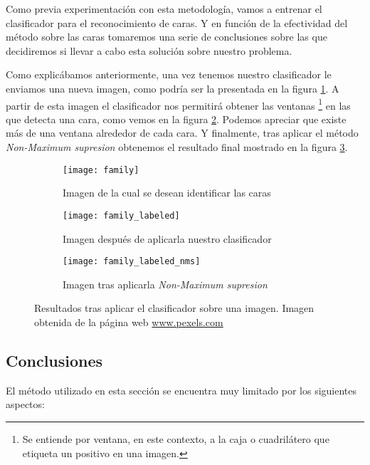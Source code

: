 Como previa experimentación con esta metodología, vamos a entrenar el clasificador para el reconocimiento de caras. Y en función de la efectividad del método sobre las caras tomaremos una serie de conclusiones sobre las que decidiremos si llevar a cabo esta solución sobre  nuestro problema.

Como explicábamos anteriormente, una vez tenemos nuestro clasificador le enviamos una nueva imagen, como podría ser la presentada en la figura \ref{subfig:family}. A partir de esta imagen el clasificador nos permitirá obtener las ventanas \footnote{Se entiende por ventana, en este contexto, a la caja o cuadrilátero que etiqueta un positivo en una imagen.} en las que detecta una cara, como vemos en la figura \ref{subfig:family_labeled}. Podemos apreciar que existe más de una ventana alrededor de cada cara. Y finalmente, tras aplicar el método \textit{Non-Maximum supresion} obtenemos el resultado final mostrado en la figura \ref{subfig:family_labeled_nms}.

\begin{figure}
	\centering
	\begin{subfigure}[b]{0.45\textwidth}
        \texttt{[image: family]}
        \caption{Imagen de la cual se desean identificar las caras}
        \label{subfig:family}
    \end{subfigure}
    \begin{subfigure}[b]{0.45\textwidth}
        \texttt{[image: family\_labeled]}
        \caption{Imagen después de aplicarla nuestro clasificador}
        \label{subfig:family_labeled}
    \end{subfigure}
    \begin{subfigure}[b]{0.45\textwidth}
        \texttt{[image: family\_labeled\_nms]}
        \caption{Imagen tras aplicarla \textit{Non-Maximum supresion}}
         \label{subfig:family_labeled_nms}
    \end{subfigure}
        \caption[Resultados tras aplicar el clasificador sobre una imagen]{Resultados tras aplicar el clasificador sobre una imagen. Imagen obtenida de la página web \url{www.pexels.com}}
	\label{fig:5.1.4}
\end{figure}

\subsection{Conclusiones}

El método utilizado en esta sección se encuentra muy limitado por los siguientes aspectos:

